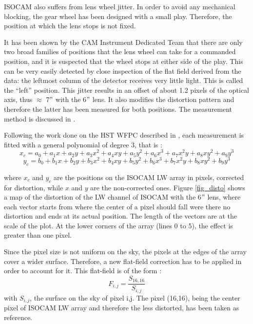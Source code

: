 ISOCAM also suffers from lens wheel jitter. In order to avoid any
mechanical blocking, the gear wheel has been designed with a small
play. Therefore, the position at which the lens stops is not fixed.

It has been shown by the CAM Instrument Dedicated Team that
there are only two broad families of positions that the lens wheel 
can take for a
commanded position, and it is suspected that the wheel stops at either
side of the play.  This can be very easily detected by close
inspection of the flat field derived from the data: the leftmost
column of the detector receives very little light.  This is called the
``left'' position.  This jitter results in an offset of about 1.2
pixels of the optical axis, thus $\approx$ 7$"$ with the 6$"$ lens. It
also modifies the distortion pattern and therefore the latter has been
measured for both positions. The measurement method is discussed in \cite{iso:aussel97}.

Following the work done on the HST WFPC described in \cite{iso:holtzman95}, %
each measurement is fitted with a general polynomial of degree 3, that
is :
\begin{equation}
x_{c} = a_{0}+ a_{1}x + a_{2} y + a_{3}x^{2}+ a_{4}x y + a_{5}y^{2} + 
a_{6}x^{3}+ a_{7}x^{2}y + a_{8}xy^{2}+ a_{9}y^{3} 
\end{equation}
\begin{equation}
y_{c} = b_{0}+ b_{1}x + b_{2} y + b_{3}x^{2}+ b_{4}x y + b_{5}y^{2} + 
b_{6}x^{3}+ b_{7}x^{2}y + b_{8}xy^{2}+ b_{9}y^{3} 
\end{equation}

where $x_{c}$ and $y_{c}$ are the positions on the ISOCAM LW array in
pixels, corrected for distortion, while $x$ and $y$ are the
non-corrected ones.  Figure \ref{fig_disto} shows a map of the
distortion of the LW channel of ISOCAM with the 6$"$ lens, where each
vector starts from where the center of a pixel should fall were there
no distortion and ends at its actual position.  The length of the
vectors are at the scale of the plot. At the lower corners of the
array (lines 0 to 5), the effect is greater than one pixel.

Since the pixel size is not uniform on the sky, the pixels at the edges of 
the array cover a wider surface. Therefore, a new flat-field correction has 
to be applied in order to account for it. This flat-field is of the 
form :
\begin{equation}
F_{i,j} = \frac{S_{16,16}}{S_{i,j}}
\end{equation}
with $S_{i,j}$, the surface on the sky of pixel i,j.  The pixel 
(16,16), being the center pixel of ISOCAM LW array and therefore the 
less distorted, has been taken as reference. 

